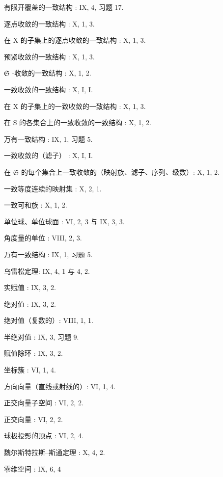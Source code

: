 有限开覆盖的一致结构 : IX, 4, 习题 17.

逐点收敛的一致结构 : X, 1, 3.

在 X 的子集上的逐点收敛的一致结构 : X, 1, 3.

预紧收敛的一致结构 : X, 1, 3.

\(\mathfrak{S}\) -收敛的一致结构 : X, 1, 2.

一致收敛的一致结构 : X, I, I.

在 X 的子集上的一致收敛的一致结构 : X, 1, 3.

在 S 的各集合上的一致收敛的一致结构 : X, 1, 2.

万有一致结构 : IX, 1, 习题 5.

一致收敛的（滤子） : X, I, I.

在 \(\mathfrak{S}\) 的每个集合上一致收敛的（映射族、滤子、序列、级数）: X, 1, 2.

一致等度连续的映射集 : X, 2, 1.

一致可和族 : X, 1, 2.

单位球、单位球面 : VI, 2, 3 与 IX, 3, 3.

角度量的单位 : VIII, 2, 3.

万有一致结构 : IX, 1, 习题 5.

乌雷松定理: IX, 4, 1 与 4, 2.

实赋值 : IX, 3, 2.

绝对值 : IX, 3, 2.

绝对值（复数的）: VIII, 1, 1.

半绝对值 : IX, 3, 习题 9.

赋值除环 : IX, 3, 2.

坐标簇 : VI, 1, 4.

方向向量（直线或射线的）: VI, 1, 4.

正交向量子空间 : VI, 2, 2.

正交向量 : VI, 2, 2.

球极投影的顶点 : VI, 2, 4.

魏尔斯特拉斯–斯通定理 : X, 4, 2.

零维空间 : IX, 6, 4
